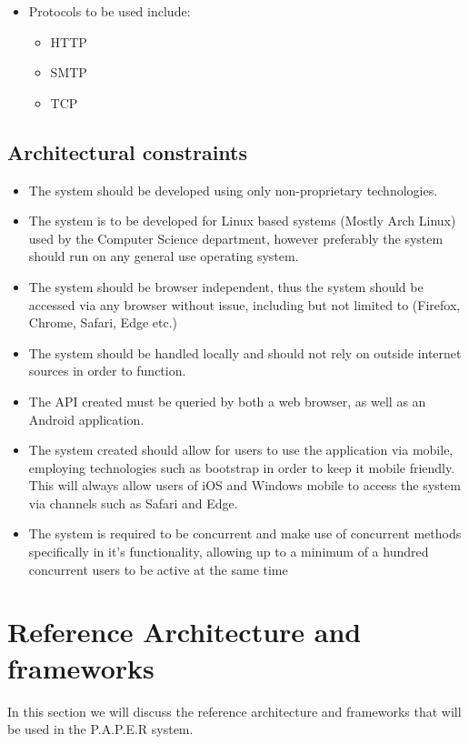 \documentclass{article}
\begin{document}
	
	\begin{itemize}
		\item Protocols to be used include:
		\begin{itemize}
			\item HTTP
			\item SMTP
			\item TCP
		\end{itemize}
	\end{itemize}
	
	\cleardoublepage
	
	\subsection{Architectural constraints}\label{subsec:constraints}
	\begin{itemize}
		\item The system should be developed using only non-proprietary technologies.
		\item The system is to be developed for Linux based systems (Mostly Arch Linux) used by the Computer Science department, however preferably the system should run on any general use operating system.
		\item The system should be browser independent, thus the system should be accessed via any browser without issue, including but not limited to (Firefox, Chrome, Safari, Edge etc.)
		\item The system should be handled locally and should not rely on outside internet sources in order to function.
		\item The API created must be queried by both a web browser, as well as an Android application.
		\item The system created should allow for users to use the application via mobile, employing technologies such as bootstrap in order to keep it mobile friendly. This will always allow users of iOS and Windows mobile to access the system via channels such as Safari and Edge.
		\item The system is required to be concurrent and make use of concurrent methods specifically in it's functionality, allowing up to a minimum of a hundred concurrent users to be active at the same time
	\end{itemize}

	\section{Reference Architecture and frameworks}\label{sec: ReferencArchitecture}
In this section we will discuss the reference architecture and frameworks that will be used in the P.A.P.E.R system.
\end{document}
